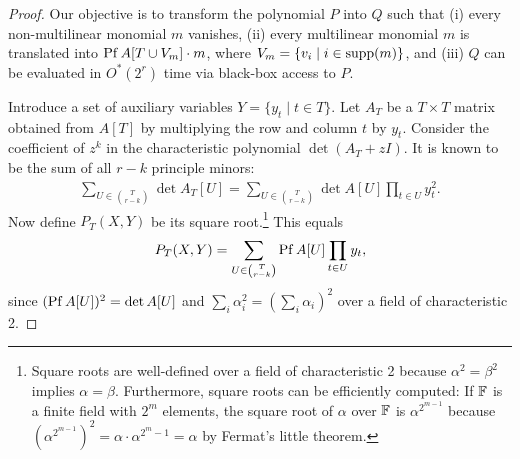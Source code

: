 \begin{proof}
  Our objective is to transform the polynomial $P$ into $Q$ such that (i) every non-multilinear monomial $m$ vanishes, (ii) every multilinear monomial $m$ is translated into $\operatorname{Pf} A[T \cup V_m] \cdot m$, where $V_m = \{ v_i \mid i \in \operatorname{supp}(m) \}$, and (iii) $Q$ can be evaluated in $O^*(2^r)$ time via black-box access to $P$.

  Introduce a set of auxiliary variables $Y=\{ y_t \mid t \in T \}$.
  Let $A_T$ be a $T \times T$ matrix obtained from $A[T]$ by multiplying the row and column $t$ by $y_t$.
  Consider the coefficient of $z^k$ in the characteristic polynomial $\det(A_T + zI)$.
  It is known to be the sum of all $r - k$ principle minors:
  \begin{align*}
    \sum_{U \in \binom{T}{r-k}} \det A_T[U]
    = \sum_{U \in \binom{T}{r-k}} \det A[U] \prod_{t \in U} y_t^2.
  \end{align*}
  Now define $P_T(X, Y)$ be its square root.\footnote{Square roots are well-defined over a field of characteristic 2 because $\alpha^2 = \beta^2$ implies $\alpha = \beta$.
  Furthermore, square roots can be efficiently computed: If $\mathbb F$ is a finite field with $2^m$ elements, the square root of $\alpha$ over $\mathbb F$ is $\alpha^{2^{m-1}}$ because $(\alpha^{2^{m-1}})^2 = \alpha \cdot \alpha^{2^m-1} = \alpha$ by Fermat's little theorem.}
  This equals
  \begin{align*}
    P_T(X, Y) = \sum_{U \in \binom{T}{r - k}} \operatorname{Pf} A[U] \prod_{t \in U} y_t,
  \end{align*}
  since $(\operatorname{Pf} A[U])^2 = \det A[U]$ and $\sum_i \alpha_i^2 = (\sum_i \alpha_i)^2$ over a field of characteristic 2.


\end{proof}
